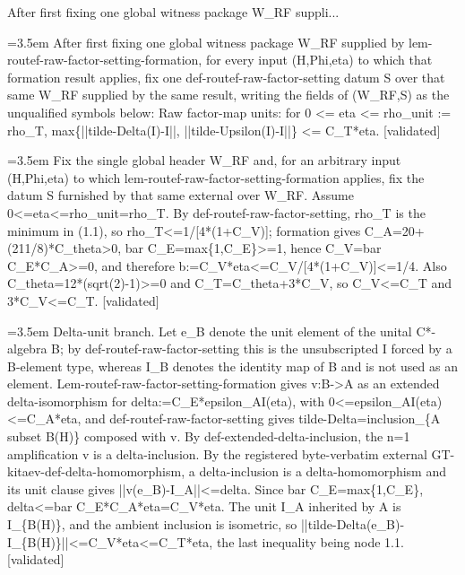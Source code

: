\documentclass{article}
\newcommand{\step}[1]{\par\noindent\hangindent=3.5em\hangafter=1%
  \makebox[3.5em][l]{\textbf{#1.}}}
\newcommand{\steptag}[1]{\hfill{\small\textsf{[#1]}}}
\begin{document}
\begin{proofbox}{After first fixing one global witness package W\_RF suppli...}
\step{1} After first fixing one global witness package W\_RF supplied by lem-routef-raw-factor-setting-formation, for every input (H,Phi,eta) to which that formation result applies, fix one def-routef-raw-factor-setting datum S over that same W\_RF supplied by the same result, writing the fields of (W\_RF,S) as the unqualified symbols below: Raw factor-map units: for 0 <= eta <= rho\_unit := rho\_T, max\{||tilde-Delta(I)-I||, ||tilde-Upsilon(I)-I||\} <= C\_T*eta. \steptag{validated} \\[6pt]
\step{1.1} Fix the single global header W\_RF and, for an arbitrary input (H,Phi,eta) to which lem-routef-raw-factor-setting-formation applies, fix the datum S furnished by that same external over W\_RF. Assume 0<=eta<=rho\_unit=rho\_T. By def-routef-raw-factor-setting, rho\_T is the minimum in (1.1), so rho\_T<=1/[4*(1+C\_V)]; formation gives C\_A=20+(211/8)*C\_theta>0, bar C\_E=max\{1,C\_E\}>=1, hence C\_V=bar C\_E*C\_A>=0, and therefore b:=C\_V*eta<=C\_V/[4*(1+C\_V)]<=1/4. Also C\_theta=12*(sqrt(2)-1)>=0 and C\_T=C\_theta+3*C\_V, so C\_V<=C\_T and 3*C\_V<=C\_T. \steptag{validated} \\[4pt]
\step{1.2} Delta-unit branch. Let e\_B denote the unit element of the unital C*-algebra B; by def-routef-raw-factor-setting this is the unsubscripted I forced by a B-element type, whereas I\_B denotes the identity map of B and is not used as an element. Lem-routef-raw-factor-setting-formation gives v:B->A as an extended delta-isomorphism for delta:=C\_E*epsilon\_AI(eta), with 0<=epsilon\_AI(eta)<=C\_A*eta, and def-routef-raw-factor-setting gives tilde-Delta=inclusion\_\{A subset B(H)\} composed with v. By def-extended-delta-inclusion, the n=1 amplification v is a delta-inclusion. By the registered byte-verbatim external GT-kitaev-def-delta-homomorphism, a delta-inclusion is a delta-homomorphism and its unit clause gives ||v(e\_B)-I\_A||<=delta. Since bar C\_E=max\{1,C\_E\}, delta<=bar C\_E*C\_A*eta=C\_V*eta. The unit I\_A inherited by A is I\_\{B(H)\}, and the ambient inclusion is isometric, so ||tilde-Delta(e\_B)-I\_\{B(H)\}||<=C\_V*eta<=C\_T*eta, the last inequality being node 1.1. \steptag{validated} \\[6pt]

\end{proofbox}
\end{document}
